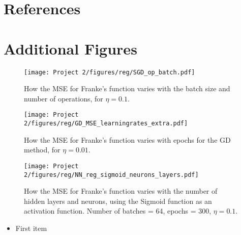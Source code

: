 \documentclass[english,notitlepage,reprint,nofootinbib]{revtex4-2}  %
\begin{document}

\section*{References}
\printbibliography[heading=none]
\newpage
\appendix

\section{Additional Figures}\label{app: figs}

\begin{figure}[h!]
    \centering %
    \texttt{[image: Project 2/figures/reg/SGD\_op\_batch.pdf]} 
    \caption{How the MSE for Franke's function varies with the batch size and number of operations, for $\eta=0.1$. }
    \label{fig: a3}
\end{figure}

\begin{figure}[h!]
    \centering %
    \texttt{[image: Project 2/figures/reg/GD\_MSE\_learningrates\_extra.pdf]} 
    \caption{How the MSE for Franke's function varies with epochs for the GD method, for $\eta=0.01$.}
    \label{fig: extra1}
\end{figure}

\begin{figure}[h!]
    \centering %
    \texttt{[image: Project 2/figures/reg/NN\_reg\_sigmoid\_neurons\_layers.pdf]} 
    \caption{How the MSE for Franke's function varies with the number of hidden layers and neurons, using the Sigmoid function as an activation function. 
    Number of batches = 64, epochs = 300,  $\eta=0.1$.
    }
    \label{fig: b_sigmoid_1}
\end{figure}

\begin{itemize}
\color{white}
\item First item
\end{itemize}
\end{document}
